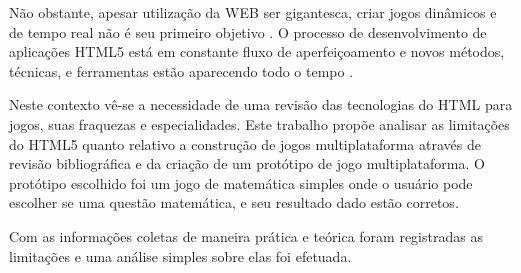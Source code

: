 Não obstante, apesar utilização da WEB ser gigantesca, criar
jogos dinâmicos e de tempo real não é seu primeiro objetivo
\autocite{html5mostwanted}. O processo de desenvolvimento de
aplicações HTML5 está em constante fluxo de aperfeiçoamento e novos
métodos, técnicas, e ferramentas estão aparecendo todo o tempo
\autocite{crossPlatformMobileGame}.

Neste contexto vê-se a necessidade de uma revisão das tecnologias do
HTML para jogos, suas fraquezas e especialidades. Este trabalho propõe
analisar as limitações do HTML5 quanto relativo a construção de
jogos multiplataforma através de revisão bibliográfica e da criação
de um protótipo de jogo multiplataforma. O protótipo escolhido foi
um jogo de matemática simples onde o usuário pode escolher se uma
questão matemática, e seu resultado dado estão corretos.

Com as informações coletas de maneira prática e teórica foram
registradas as limitações e uma análise simples sobre elas foi
efetuada.
